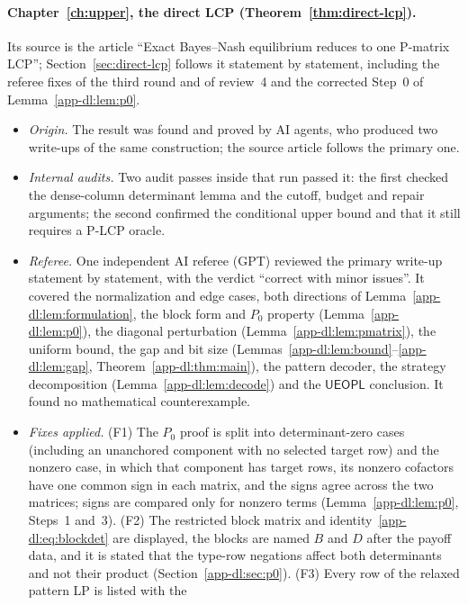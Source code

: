 \paragraph{Chapter~\ref{ch:upper}, the direct LCP (Theorem~\ref{thm:direct-lcp}).}
Its source is the article ``Exact Bayes--Nash equilibrium reduces to one P-matrix LCP''; Section~\ref{sec:direct-lcp} follows it statement by statement, including the referee fixes of the third round and of review~4 and the corrected Step~0 of Lemma~\ref{app-dl:lem:p0}.
\begin{itemize}[nosep]
  \item \emph{Origin.} The result was found and proved by AI agents, who produced two write-ups of the same construction; the source article follows the primary one.
  \item \emph{Internal audits.} Two audit passes inside that run passed it: the first checked the
        dense-column determinant lemma and the cutoff, budget and repair arguments; the second confirmed
        the conditional upper bound and that it still requires a P-LCP oracle.
  \item \emph{Referee.} One independent AI referee (GPT) reviewed the primary write-up statement by
        statement, with the verdict ``correct with minor issues''. It covered the normalization and edge
        cases, both directions of Lemma~\ref{app-dl:lem:formulation}, the block form and $P_0$ property
        (Lemma~\ref{app-dl:lem:p0}), the diagonal perturbation (Lemma~\ref{app-dl:lem:pmatrix}), the
        uniform bound, the gap and bit size (Lemmas~\ref{app-dl:lem:bound}--\ref{app-dl:lem:gap},
        Theorem~\ref{app-dl:thm:main}), the pattern decoder, the strategy decomposition
        (Lemma~\ref{app-dl:lem:decode}) and the $\mathsf{UEOPL}$ conclusion. It found no mathematical
        counterexample.
  \item \emph{Fixes applied.} (F1) The $P_0$ proof is split into determinant-zero cases (including an
        unanchored component with no selected target row) and the nonzero case, in which that component
        has target rows, its nonzero cofactors have one common sign in each matrix, and the signs agree
        across the two matrices; signs are compared only for nonzero terms
        (Lemma~\ref{app-dl:lem:p0}, Steps~1 and~3). (F2) The restricted block matrix and
        identity~\eqref{app-dl:eq:blockdet} are displayed, the blocks are named $B$ and $D$ after the
        payoff data, and it is stated that the type-row negations affect both determinants and not their
        product (Section~\ref{app-dl:sec:p0}). (F3) Every row of the relaxed pattern LP is listed with the

\end{itemize}
